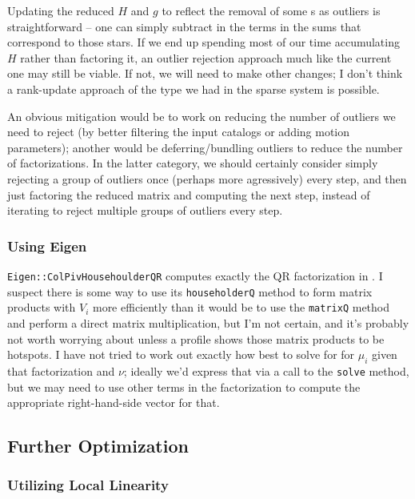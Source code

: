 Updating the reduced $H$ and $g$ to reflect the removal of some s as outliers is straightforward -- one can simply subtract in the terms in the sums that correspond to those stars.
If we end up spending most of our time accumulating $H$ rather than factoring it, an outlier rejection approach much like the current one may still be viable.
If not, we will need to make other changes; I don't think a rank-update approach of the type we had in the sparse system is possible.

An obvious mitigation would be to work on reducing the number of outliers we need to reject (by better filtering the input catalogs or adding motion parameters); another would be deferring/bundling outliers to reduce the number of factorizations.
In the latter category, we should certainly consider simply rejecting a group of outliers once (perhaps more agressively) every step, and then just factoring the reduced matrix and computing the next step, instead of iterating to reject multiple groups of outliers every step.

\subsubsection{Using Eigen}

\texttt{Eigen::ColPivHousehoulderQR} computes exactly the QR factorization in .
I suspect there is some way to use its \texttt{householderQ} method to form matrix products with $V_i$ more efficiently than it would be to use the \texttt{matrixQ} method and perform a direct matrix multiplication, but I'm not certain, and it's probably not worth worrying about unless a profile shows those matrix products to be hotspots.
I have not tried to work out exactly how best to solve for for $\mu_i$ given that factorization and $\nu$; ideally we'd express that via a call to the \texttt{solve} method, but we may need to use other terms in the factorization to compute the appropriate right-hand-side vector for that.

\subsection{Further Optimization}
\label{sec:vp_further_optimization}

\subsubsection{Utilizing Local Linearity}
\label{subsec:vp_local_linearity}

